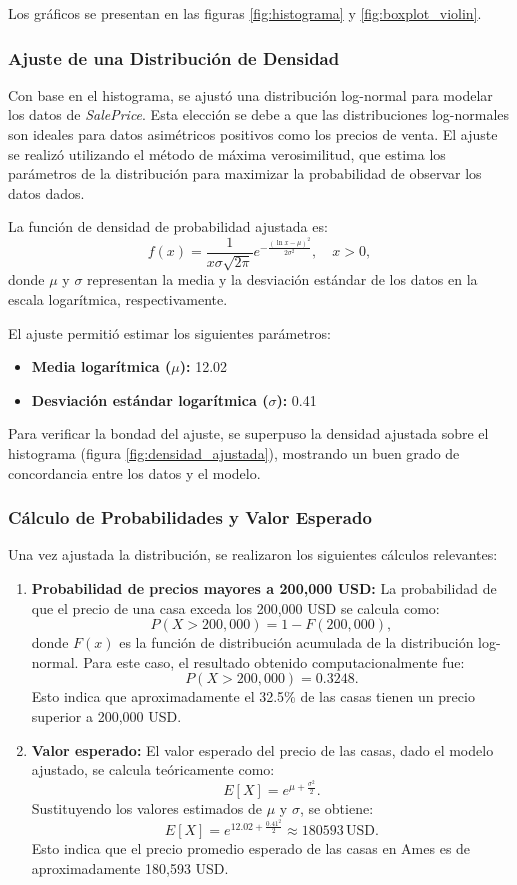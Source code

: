 \documentclass[12pt]{article}
\begin{document}
Los gráficos se presentan en las figuras \ref{fig:histograma} y \ref{fig:boxplot_violin}.

\subsubsection{Ajuste de una Distribución de Densidad}
Con base en el histograma, se ajustó una distribución log-normal para modelar los datos de \textit{SalePrice}. Esta elección se debe a que las distribuciones log-normales son ideales para datos asimétricos positivos como los precios de venta. El ajuste se realizó utilizando el método de máxima verosimilitud, que estima los parámetros de la distribución para maximizar la probabilidad de observar los datos dados.

La función de densidad de probabilidad ajustada es:
\[
f(x) = \frac{1}{x \sigma \sqrt{2\pi}} e^{-\frac{(\ln x - \mu)^2}{2\sigma^2}}, \quad x > 0,
\]
donde $\mu$ y $\sigma$ representan la media y la desviación estándar de los datos en la escala logarítmica, respectivamente.

El ajuste permitió estimar los siguientes parámetros:
\begin{itemize}
    \item \textbf{Media logarítmica ($\mu$):} 12.02 
    \item \textbf{Desviación estándar logarítmica ($\sigma$):} 0.41 
\end{itemize}

Para verificar la bondad del ajuste, se superpuso la densidad ajustada sobre el histograma (figura \ref{fig:densidad_ajustada}), mostrando un buen grado de concordancia entre los datos y el modelo.

\subsubsection{Cálculo de Probabilidades y Valor Esperado}
Una vez ajustada la distribución, se realizaron los siguientes cálculos relevantes:

\begin{enumerate}
    \item \textbf{Probabilidad de precios mayores a 200,000 USD:}
    La probabilidad de que el precio de una casa exceda los 200,000 USD se calcula como:
    \[
    P(X > 200{,}000) = 1 - F(200{,}000),
    \]
    donde $F(x)$ es la función de distribución acumulada de la distribución log-normal. Para este caso, el resultado obtenido computacionalmente fue:
    \[
    P(X > 200{,}000) = 0.3248.
    \]
    Esto indica que aproximadamente el 32.5\% de las casas tienen un precio superior a 200,000 USD.

    \item \textbf{Valor esperado:}
    El valor esperado del precio de las casas, dado el modelo ajustado, se calcula teóricamente como:
    \[
    E[X] = e^{\mu + \frac{\sigma^2}{2} }.
    \]
    Sustituyendo los valores estimados de $\mu$ y $\sigma$, se obtiene:
    \[
    E[X] = e^{12.02 + \frac{0.41^2}{2}} \approx \num{180593} \, \text{USD}.
    \]
    Esto indica que el precio promedio esperado de las casas en Ames es de aproximadamente 180,593 USD.
\end{enumerate}
\end{document}
